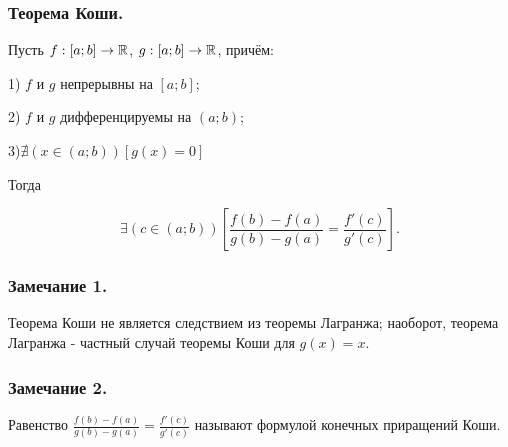 \subsubsection{Теорема Коши.}

Пусть $f:[a;b]\to \mathbb{R}$, $g:[a;b]\to \mathbb{R}$, причём:

1) $f$ и $g$ непрерывны на $[a;b]$;

2) $f$ и $g$ дифференцируемы на $(a;b)$;

3)$\nexists (x \in (a;b))[g(x)=0]$

Тогда

$$
\exists (c \in (a;b))\left[ \frac{f(b)-f(a)}{g(b)-g(a)}=\frac{f'(c)}{g'(c)}\right].
$$

\subsubsection{Замечание 1.}

Теорема Коши не является следствием из теоремы Лагранжа; наоборот, теорема Лагранжа - частный случай теоремы Коши для $g(x)=x$.

\subsubsection{Замечание 2.}

Равенство $ \frac{f(b)-f(a)}{g(b)-g(a)}=\frac{f'(c)}{g'(c)}$ называют формулой конечных приращений Коши.

